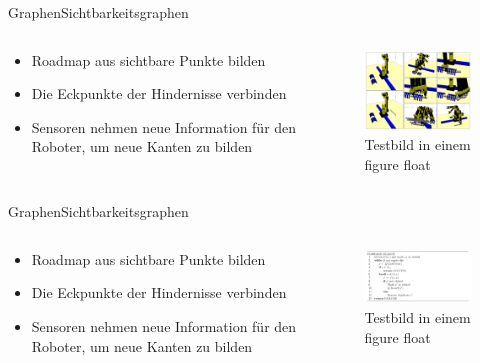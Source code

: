 \documentclass[t,aspectratio=169,dvipsnames]{beamer}
\begin{document}
\begin{frame}{Graphen}{Sichtbarkeitsgraphen}
	\begin{columns}
		\begin{column}[T]{0.5\textwidth}
			\begin{itemize}
				\item Roadmap aus sichtbare Punkte bilden
				\item Die Eckpunkte der Hindernisse verbinden
				\item Sensoren nehmen neue Information für den Roboter, um neue  Kanten zu bilden
			\end{itemize}
		\end{column}
		\begin{column}[T]{0.5\textwidth}
			\begin{figure}
				\includegraphics[width=6.5cm]{images/hierarchical.png}
				\caption{Testbild in einem figure float} 
			\end{figure}
		\end{column}
	\end{columns}
\end{frame}
\begin{frame}{Graphen}{Sichtbarkeitsgraphen}
	\begin{columns}
		\begin{column}[T]{0.5\textwidth}
			\begin{itemize}
				\item Roadmap aus sichtbare Punkte bilden
				\item Die Eckpunkte der Hindernisse verbinden
				\item Sensoren nehmen neue Information für den Roboter, um neue  Kanten zu bilden
			\end{itemize}
		\end{column}
		\begin{column}[T]{0.5\textwidth}
			\begin{figure}
				\includegraphics[width=6.5cm]{images/img225.png}
				\caption{Testbild in einem figure float} 
			\end{figure}
		\end{column}
	\end{columns}
\end{frame}
\end{document}
